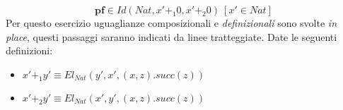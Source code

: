 \begin{displaymath}
    \textbf{pf} \in Id(Nat, x' +_1 0, x' +_2 0)\ [x' \in Nat]
\end{displaymath}
Per questo esercizio uguaglianze composizionali e \textit{definizionali} sono svolte \textit{in place}, questi passaggi saranno indicati da linee tratteggiate.
Date le seguenti definizioni:
\begin{itemize}
    \item $x' +_1 y' \equiv El_{Nat} (y', x', (x, z).succ(z))$
    \item $x' +_2 y' \equiv El_{Nat} (x', y', (x, z).succ(z))$
\end{itemize}